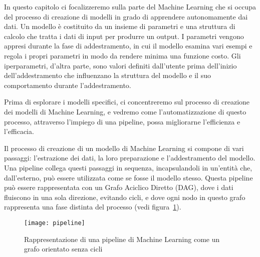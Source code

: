 \label{chap:teoria}

In questo capitolo ci focalizzeremo sulla parte del Machine Learning che si
occupa del processo di creazione di modelli in grado di apprendere
autonomamente dai dati. Un modello è costituito da un insieme di parametri e
una struttura di calcolo che tratta i dati di input per produrre un output. I
parametri vengono appresi durante la fase di addestramento, in cui il modello
esamina vari esempi e regola i propri parametri in modo da rendere minima una
funzione costo. Gli iperparametri, d'altra parte, sono valori definiti
dall'utente prima dell'inizio dell'addestramento che influenzano la struttura
del modello e il suo comportamento durante l'addestramento.

Prima di esplorare i modelli specifici, ci concentreremo sul processo di
creazione dei modelli di Machine Learning, e vedremo come l'automatizzazione
di questo processo, attraverso l'impiego di una pipeline, possa migliorarne
l'efficienza e l'efficacia.

Il processo di creazione di un modello di Machine Learning si compone di vari
passaggi: l'estrazione dei dati, la loro preparazione e l'addestramento del
modello. Una pipeline collega questi passaggi in sequenza, incapsulandoli in
un'entità che, dall'esterno, può essere utilizzata come se fosse il modello
stesso. Questa pipeline può essere rappresentata con un Grafo Aciclico Diretto
(DAG), dove i dati fluiscono in una sola direzione, evitando cicli, e dove
ogni nodo in questo grafo rappresenta una fase distinta del processo (vedi
figura~\ref{fig:ml_pipeline_dag}).

\begin{figure}[!ht]
    \centering
    \texttt{[image: pipeline]}
    \caption{Rappresentazione di una pipeline di Machine Learning come un
    grafo orientato senza cicli}
    \label{fig:ml_pipeline_dag}
\end{figure}


